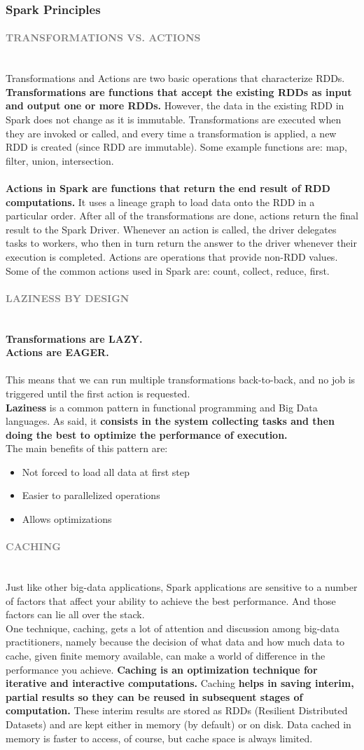 \documentclass[10pt,a4paper]{article}
\newcommand{\nline}{\\~\\}
\newcommand{\myparagraph}[1]{\paragraph{\normalsize{\textcolor{gray}{\uppercase{\textbf{#1}}}} }\mbox{} \vspace{0.5em}\\}
\begin{document}
\subsubsection{Spark Principles}
\myparagraph{Transformations vs. Actions}
Transformations and Actions are two basic operations that characterize RDDs.
\textbf{Transformations are functions that accept the existing RDDs as input and output one or more RDDs.} However, the data in the existing RDD in Spark does not change as it is immutable. Transformations are executed when they are invoked or called, and every time a transformation is applied, a new RDD is created (since RDD are immutable).
Some example functions are: map, filter, union, intersection.
\nline
\textbf{Actions in Spark are functions that return the end result of RDD computations.} It uses a lineage graph to load data onto the RDD in a particular order. After all of the transformations are done, actions return the final result to the Spark Driver. Whenever an action is called, the driver delegates tasks to workers, who then in turn return the answer to the driver whenever their execution is completed.
Actions are operations that provide non-RDD values. Some of the common actions used in Spark are: count, collect, reduce, first.
\myparagraph{Laziness by Design}
\textbf{Transformations are LAZY.} \\
\textbf{Actions are EAGER. }
\nline
This means that we can run multiple transformations back-to-back, and no job is triggered until the first action is requested. \\
\textbf{Laziness} is a common pattern in functional programming and Big Data languages. As said, it \textbf{consists in the system collecting tasks and then doing the best to optimize the performance of execution. } \\
The main benefits of this pattern are:
\begin{itemize}
	\item Not forced to load all data at first step
	\item Easier to parallelized operations
	\item Allows optimizations
\end{itemize}
\myparagraph{Caching}
Just like other big-data applications, Spark applications are sensitive to a number of factors that affect your ability to achieve the best performance.  And those factors can lie all over the stack.  \\
One technique, caching, gets a lot of attention and discussion among big-data practitioners, namely because the decision of what data and how much data to cache, given finite memory available, can make a world of difference in the performance you achieve. 
\textbf{Caching is an optimization technique for iterative and interactive computations.} Caching \textbf{helps in saving interim, partial results so they can be reused in subsequent stages of computation.} These interim results are stored as RDDs (Resilient Distributed Datasets) and are kept either in memory (by default) or on disk.  Data cached in memory is faster to access, of course, but cache space is always limited.
\end{document}
